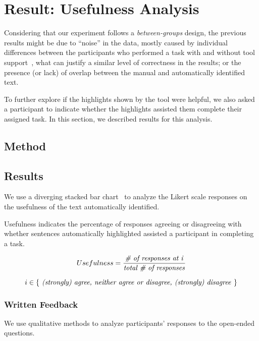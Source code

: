 
\section{Result: Usefulness Analysis}
\label{cp6:usefulness}




Considering that our experiment follows a \textit{between-groups} design, 
the previous results might be due to ``noise'' in the data, mostly caused by individual differences between the participants who performed a task with and without tool support~\cite{Lazar2017-cp3}, what can justify a similar level of correctness in the results; or the presence (or lack) of overlap between the manual and automatically identified 
text. 


To further explore if the highlights shown by the tool were helpful, we also asked a participant 
to indicate whether the highlights assisted them complete their assigned task. 
In this section, we described results for this analysis. 



\subsection{Method}



\subsection{Results}



We use a diverging stacked bar chart~\cite{Heiberger2014} to analyze the  Likert scale
responses on the usefulness of the text automatically identified.


Usefulness indicates the percentage of responses agreeing or disagreeing with whether sentences
automatically highlighted assisted a participant in completing a task.


\smallskip
\begin{small}

\begin{equation}
Usefulness = \frac{
    \text{\textit{\# of responses at i}}
}{
    \text{\textit{total \# of responses}}
}
\end{equation}
        

\begin{equation*}
i \in \{ 
    \text{\textit{
        (strongly) agree, neither agree or disagree, (strongly) disagree
    }}  
\}
\end{equation*}
\end{small}





\subsubsection{Written Feedback}

 
We use qualitative methods to analyze participants' responses to the open-ended questions. 

